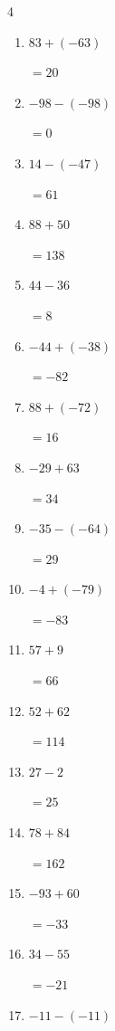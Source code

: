 \begin{multicols}{4}
\begin{enumerate}
        $=-149$

  \item $83+(-63)$

        $=20$

  \item $-98-(-98)$

        $=0$

  \item $14-(-47)$

        $=61$

  \item $88+50$

        $=138$

  \item $44-36$

        $=8$

  \item $-44+(-38)$

        $=-82$

  \item $88+(-72)$

        $=16$

  \item $-29+63$

        $=34$

  \item $-35-(-64)$

        $=29$

  \item $-4+(-79)$

        $=-83$

  \item $57+9$

        $=66$

  \item $52+62$

        $=114$

  \item $27-2$

        $=25$

  \item $78+84$

        $=162$

  \item $-93+60$

        $=-33$

  \item $34-55$

        $=-21$

  \item $-11-(-11)$


\end{enumerate}
\end{multicols}
